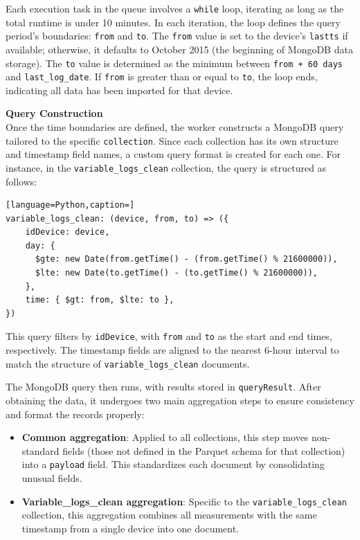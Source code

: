 Each execution task in the queue involves a \texttt{while} loop, iterating as long as the total runtime is under 10 minutes. In each iteration, the loop defines the query period’s boundaries: \texttt{from} and \texttt{to}. The \texttt{from} value is set to the device’s \texttt{lastts} if available; otherwise, it defaults to October 2015 (the beginning of MongoDB data storage). The \texttt{to} value is determined as the minimum between \texttt{from + 60 days} and \texttt{last\_log\_date}. If \texttt{from} is greater than or equal to \texttt{to}, the loop ends, indicating all data has been imported for that device.

\textbf{Query Construction} \\
Once the time boundaries are defined, the worker constructs a MongoDB query tailored to the specific \texttt{collection}. Since each collection has its own structure and timestamp field names, a custom query format is created for each one. For instance, in the \texttt{variable\_logs\_clean} collection, the query is structured as follows:

\begin{lstlisting}[language=Python,caption=]
variable_logs_clean: (device, from, to) => ({
    idDevice: device,
    day: {
      $gte: new Date(from.getTime() - (from.getTime() % 21600000)),
      $lte: new Date(to.getTime() - (to.getTime() % 21600000)),
    },
    time: { $gt: from, $lte: to },
})
\end{lstlisting}

This query filters by \texttt{idDevice}, with \texttt{from} and \texttt{to} as the start and end times, respectively. The timestamp fields are aligned to the nearest 6-hour interval to match the structure of \texttt{variable\_logs\_clean} documents.

The MongoDB query then runs, with results stored in \texttt{queryResult}. After obtaining the data, it undergoes two main aggregation steps to ensure consistency and format the records properly:

\begin{itemize}
    \item \textbf{Common aggregation}: Applied to all collections, this step moves non-standard fields (those not defined in the Parquet schema for that collection) into a \texttt{payload} field. This standardizes each document by consolidating unusual fields.
    \item \textbf{Variable\_logs\_clean aggregation}: Specific to the \texttt{variable\_logs\_clean} collection, this aggregation combines all measurements with the same timestamp from a single device into one document.
\end{itemize}

